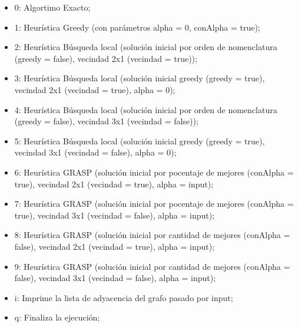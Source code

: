 \documentclass[a4paper]{article}
\begin{document}
\begin{itemize}
\item 0: Algortimo Exacto;
\item 1: Heur\'istica Greedy (con par\'ametros alpha = 0, conAlpha = true);
\item 2: Heur\'istica B\'usqueda local (soluci\'on inicial por orden de nomenclatura (greedy = false), vecindad 2x1 (vecindad = true));
\item 3: Heur\'istica B\'usqueda local (soluci\'on inicial greedy (greedy = true), vecindad 2x1 (vecindad = true), alpha = 0);
\item 4: Heur\'istica B\'usqueda local (soluci\'on inicial por orden de nomenclatura (greedy = false), vecindad 3x1 (vecindad = false));
\item 5: Heur\'istica B\'usqueda local (soluci\'on inicial greedy (greedy = true), vecindad 3x1 (vecindad = false), alpha = 0);
\item 6: Heur\'istica GRASP (soluci\'on inicial por pocentaje de mejores (conAlpha = true), vecindad 2x1 (vecindad = true), alpha = input);
\item 7: Heur\'istica GRASP (soluci\'on inicial por pocentaje de mejores (conAlpha = true), vecindad 3x1 (vecindad = false), alpha = input);
\item 8: Heur\'istica GRASP (soluci\'on inicial por cantidad de mejores (conAlpha = false), vecindad 2x1 (vecindad = true), alpha = input);
\item 9: Heur\'istica GRASP (soluci\'on inicial por cantidad de mejores (conAlpha = false), vecindad 3x1 (vecindad = false), alpha = input);
\item i: Imprime la lista de adyacencia del grafo pasado por input;
\item q: Finaliza la ejecuci\'on;
\end{itemize}






\end{document}
